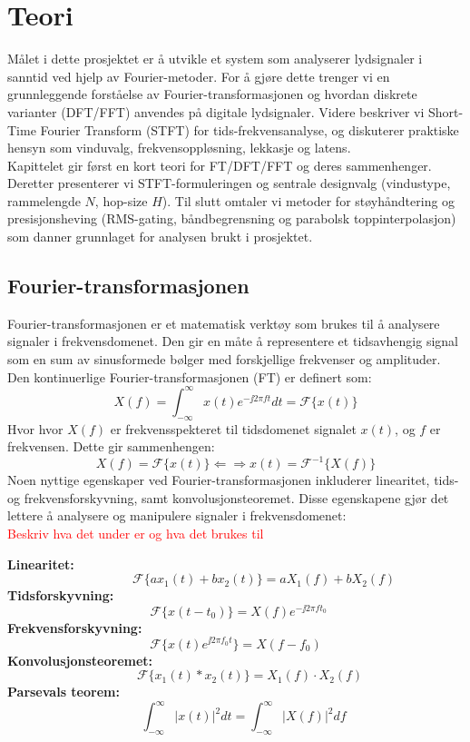 \section{Teori}
Målet i dette prosjektet er å utvikle et system som analyserer lydsignaler i sanntid ved hjelp av Fourier-metoder. For å gjøre dette trenger vi en grunnleggende forståelse av Fourier-transformasjonen og hvordan diskrete varianter (DFT/FFT) anvendes på digitale lydsignaler. Videre beskriver vi Short-Time Fourier Transform (STFT) for tids-frekvensanalyse, og diskuterer praktiske hensyn som vinduvalg, frekvensoppløsning, lekkasje og latens.\\[1em]
Kapittelet gir først en kort teori for FT/DFT/FFT og deres sammenhenger. Deretter presenterer vi STFT-formuleringen og sentrale designvalg (vindustype, rammelengde $N$, hop-size $H$). Til slutt omtaler vi metoder for støyhåndtering og presisjonsheving (RMS-gating, båndbegrensning og parabolsk toppinterpolasjon) som danner grunnlaget for analysen brukt i prosjektet.
\subsection{Fourier-transformasjonen}
Fourier-transformasjonen er et matematisk verktøy som brukes til å analysere signaler i frekvensdomenet. Den gir en måte å representere et tidsavhengig signal som en sum av sinusformede bølger med forskjellige frekvenser og amplituder. Den kontinuerlige Fourier-transformasjonen (FT) er definert som:
\begin{equation}
X(f) = \int_{-\infty}^{\infty} x(t) e^{-\jj 2 \pi f t} dt = \mathcal{F}\{x(t)\}
\end{equation}
Hvor hvor $X(f)$ er frekvensspekteret til tidsdomenet signalet $x(t)$, og $f$ er frekvensen. Dette gir sammenhengen:
\[
    X(f) = \mathcal{F}\{x(t)\} \Leftarrow \Rightarrow x(t) = \mathcal{F}^{-1}\{X(f)\}
\]
Noen nyttige egenskaper ved Fourier-transformasjonen inkluderer linearitet, tids- og frekvensforskyvning, samt konvolusjonsteoremet. Disse egenskapene gjør det lettere å analysere og manipulere signaler i frekvensdomenet:\\
\textcolor{red}{Beskriv hva det under er og hva det brukes til}

\textbf{Linearitet:} 
\[
    \qquad  \qquad \ \ \mathcal{F}\{a x_1(t) + b x_2(t)\} = a X_1(f) + b X_2(f)
\]
\textbf{Tidsforskyvning:}
\[
    \ \ \mathcal{F}\{x(t - t_0)\} = X(f) e^{-\jj 2 \pi f t_0}
\]
\textbf{Frekvensforskyvning:} 
\[
    \mathcal{F}\{x(t) e^{\jj 2 \pi f_0 t}\} = X(f - f_0)
\]
\textbf{Konvolusjonsteoremet:} 
\[
    \qquad \ \mathcal{F}\{x_1(t) * x_2(t)\} = X_1(f) \cdot X_2(f)
\]
\textbf{Parsevals teorem:} 
\[
    \ \quad \int_{-\infty}^{\infty} |x(t)|^2 dt = \int_{-\infty}^{\infty} |X(f)|^2 df
\]
